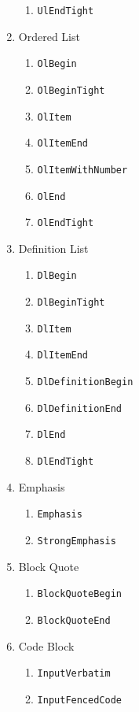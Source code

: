 \documentclass[
  digital,     %
  oneside,     %
  nosansbold,  %
  nocolorbold, %
  lof,         %
  lot,         %
]{fithesis4}
\begin{document}
\begin{figure}
\begin{multicols}{2}
\begin{enumerate}
\begin{enumerate}
        \item \texttt{UlEndTight}
      \end{enumerate}
      \item Ordered List
      \begin{enumerate}
        \item \texttt{OlBegin}
        \item \texttt{OlBeginTight}
        \item \texttt{OlItem}
        \item \texttt{OlItemEnd}
        \item \texttt{OlItemWithNumber}
        \item \texttt{OlEnd}
        \item \texttt{OlEndTight}
      \end{enumerate}
      \item Definition List
      \begin{enumerate}
        \item \texttt{DlBegin}
        \item \texttt{DlBeginTight}
        \item \texttt{DlItem}
        \item \texttt{DlItemEnd}
        \item \texttt{DlDefinitionBegin}
        \item \texttt{DlDefinitionEnd}
        \item \texttt{DlEnd}
        \item \texttt{DlEndTight}
      \end{enumerate}
      \item Emphasis
      \begin{enumerate}
        \item \texttt{Emphasis}
        \item \texttt{StrongEmphasis}
      \end{enumerate}
      \item Block Quote
      \begin{enumerate}
        \item \texttt{BlockQuoteBegin}
        \item \texttt{BlockQuoteEnd}
      \end{enumerate}
      \item Code Block
      \begin{enumerate}
        \item \texttt{InputVerbatim}
        \item \texttt{InputFencedCode}
      \end{enumerate}

\end{enumerate}
\end{multicols}
\end{figure}
\end{document}
